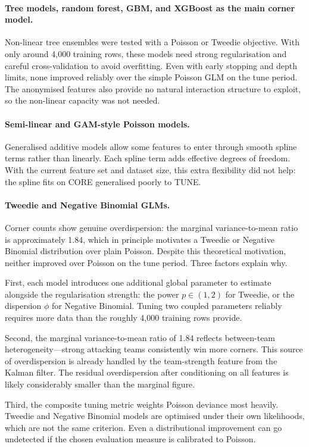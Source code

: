 \documentclass[11pt]{article}
\begin{document}
\paragraph{Tree models, random forest, GBM, and XGBoost as the main corner model.}
Non-linear tree ensembles were tested with a Poisson or Tweedie objective.
With only around 4{,}000 training rows, these models need strong regularisation
and careful cross-validation to avoid overfitting. Even with early stopping and
depth limits, none improved reliably over the simple Poisson GLM on the tune
period. The anonymised features also provide no natural interaction structure
to exploit, so the non-linear capacity was not needed.

\paragraph{Semi-linear and GAM-style Poisson models.}
Generalised additive models allow some features to enter through smooth spline
terms rather than linearly. Each spline term adds effective degrees of freedom.
With the current feature set and dataset size, this extra flexibility did not
help: the spline fits on CORE generalised poorly to TUNE.

\paragraph{Tweedie and Negative Binomial GLMs.}
Corner counts show genuine overdispersion: the marginal variance-to-mean ratio
is approximately 1.84, which in principle motivates a Tweedie or Negative
Binomial distribution over plain Poisson. Despite this theoretical motivation,
neither improved over Poisson on the tune period. Three factors explain why.

First, each model introduces one additional global parameter to estimate
alongside the regularisation strength: the power $p\in(1,2)$ for Tweedie, or
the dispersion $\phi$ for Negative Binomial. Tuning two coupled parameters
reliably requires more data than the roughly 4{,}000 training rows provide.

Second, the marginal variance-to-mean ratio of 1.84 reflects
between-team heterogeneity---strong attacking teams consistently win more
corners. This source of overdispersion is already handled by the team-strength
feature from the Kalman filter. The residual overdispersion after conditioning
on all features is likely considerably smaller than the marginal figure.

Third, the composite tuning metric weights Poisson deviance most heavily.
Tweedie and Negative Binomial models are optimised under their own likelihoods,
which are not the same criterion. Even a distributional improvement can go
undetected if the chosen evaluation measure is calibrated to Poisson.
\end{document}
